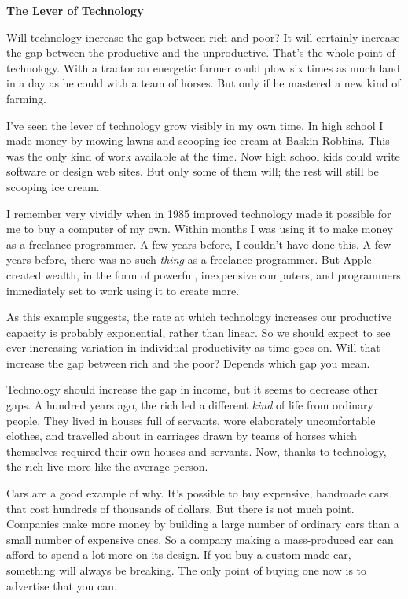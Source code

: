 \textbf{The Lever of Technology}

Will technology increase the gap between rich and poor? It will
certainly increase the gap between the productive and the unproductive.
That's the whole point of technology. With a tractor an energetic farmer
could plow six times as much land in a day as he could with a team of
horses. But only if he mastered a new kind of farming.

I've seen the lever of technology grow visibly in my own time. In high
school I made money by mowing lawns and scooping ice cream at
Baskin-Robbins. This was the only kind of work available at the time.
Now high school kids could write software or design web sites. But only
some of them will; the rest will still be scooping ice cream.

I remember very vividly when in 1985 improved technology made it
possible for me to buy a computer of my own. Within months I was using
it to make money as a freelance programmer. A few years before, I
couldn't have done this. A few years before, there was no such
\emph{thing} as a freelance programmer. But Apple created wealth, in the
form of powerful, inexpensive computers, and programmers immediately set
to work using it to create more.

As this example suggests, the rate at which technology increases our
productive capacity is probably exponential, rather than linear. So we
should expect to see ever-increasing variation in individual
productivity as time goes on. Will that increase the gap between rich
and the poor? Depends which gap you mean.

Technology should increase the gap in income, but it seems to decrease
other gaps. A hundred years ago, the rich led a different \emph{kind} of
life from ordinary people. They lived in houses full of servants, wore
elaborately uncomfortable clothes, and travelled about in carriages
drawn by teams of horses which themselves required their own houses and
servants. Now, thanks to technology, the rich live more like the average
person.

Cars are a good example of why. It's possible to buy expensive, handmade
cars that cost hundreds of thousands of dollars. But there is not much
point. Companies make more money by building a large number of ordinary
cars than a small number of expensive ones. So a company making a
mass-produced car can afford to spend a lot more on its design. If you
buy a custom-made car, something will always be breaking. The only point
of buying one now is to advertise that you can.

